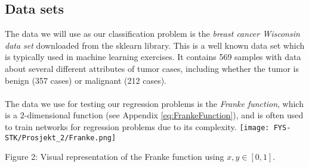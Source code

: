 \documentclass[english,notitlepage,reprint,nofootinbib]{revtex4-1}  %
\begin{document}
\subsection{Data sets}
The data we will use as our classification problem is the \textit{breast cancer Wisconsin data set} downloaded from the sklearn library. %
This is a well known data set which is typically used in machine learning exercises. %
It contains 569 samples with data about several different attributes of tumor cases, including whether the tumor is benign (357 cases) or malignant (212 cases). 
\\
\\
The data we use for testing our regression problems is the \textit{Franke function}, which is a $2$-dimensional function (see Appendix \ref{eq:FrankeFunction}), and is often used to train networks for regression problems due to its complexity. 
\texttt{[image: FYS-STK/Prosjekt\_2/Franke.png]}
\caption{Figure 2: Visual representation of the Franke function using $x,y \in [0,1]$.}
\end{document}
